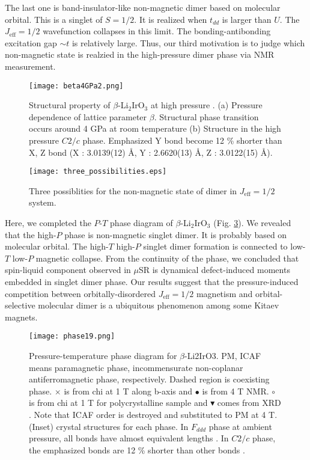 The last one is band-insulator-like non-magnetic dimer based on molecular orbital.
This is a singlet of $S = 1/2$.
It is realized when $t_{dd}$ is larger than $U$.
The $J_{\mathrm{eff}} = 1/2$ wavefunction collapses in this limit.
The bonding-antibonding excitation gap $\sim t$ is relatively large.
Thus, our third motivation is to judge which non-magnetic state is realzied in the high-pressure dimer phase via NMR measurement.

\begin{figure}
  \centering
  \texttt{[image: beta4GPa2.png]}
  \caption{Structural property of $\beta$-Li$_2$IrO$_3$ at high pressure \cite{veiga2017pressure}.
  (a) Pressure dependence of lattice parameter $\beta$.
  Structural phase transition occurs around 4 GPa at room temperature
  (b) Structure in the high pressure $C2/c$ phase.
  Emphasized Y bond become 12 \% shorter than X, Z bond (X : 3.0139(12) \AA, Y : 2.6620(13) \AA, Z : 3.0122(15) \AA). }
  \label{beta4GPa}
\end{figure}

\begin{figure}
  \centering
  \texttt{[image: three\_possibilities.eps]}
  \caption{Three possiblities for the non-magnetic state of dimer in $J_{\mathrm{eff}} = 1/2$ system.}
  \label{three}
\end{figure}

Here, we completed the $P$-$T$ phase diagram of $\beta$-Li$_2$IrO$_3$ (Fig. \ref{phase_pre}).
We revealed that the high-$P$ phase is non-magnetic singlet dimer.
It is probably based on molecular orbital.
The high-$T$ high-$P$ singlet dimer formation is connected to low-$T$ low-$P$ magnetic collapse.
From the continuity of the phase, we concluded that spin-liquid component observed in $\mu$SR is dynamical defect-induced moments embedded in singlet dimer phase.
Our results suggest that the pressure-induced competition between orbitally-disordered $J_{\mathrm{eff}} = 1/2$ magnetism and orbital-selective molecular dimer
is a ubiquitous phenomenon among some Kitaev magnets.

\begin{figure}[h]
  \centering
  \texttt{[image: phase19.png]}
  \caption{Pressure-temperature phase diagram for $\beta$-Li2IrO3.
  PM, ICAF means paramagnetic phase, incommensurate non-coplanar antiferromagnetic phase, respectively.
  Dashed region is coexisting phase.
  $\times$ is from chi at 1 T along b-axis and $\bullet$ is from 4 T NMR.
  $\circ$ is from chi at 1 T for polycrystalline sample \cite{Majumder2018} and $\blacktriangledown$ comes from XRD \cite{veiga2017pressure}.
  Note that ICAF order is destroyed and substituted to PM at 4 T. (Inset) crystal structures for each phase.
  In $F_{ddd}$ phase at ambient pressure, all bonds have almost equivalent lengths \cite{takayama2015hyperhoneycomb}.
  In $C2/c$ phase, the emphasized bonds are 12 \% shorter than other bonds \cite{veiga2017pressure}.}
  \label{phase_pre}
\end{figure}

